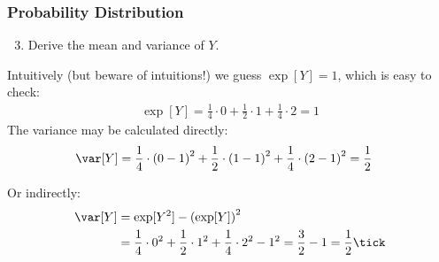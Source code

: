 \begin{frame}
\frametitle{Probability Distribution}
\ask
\begin{enumerate}\setcounter{enumi}{2}
\item Derive the mean and variance of $Y$.
\end{enumerate}

\begin{answer}
Intuitively (but beware of intuitions!) we guess $\exp[Y]=1$, which is easy to check:
\begin{align*}
\exp[Y] 
  = \frac{1}{4} \cdot 0
  + \frac{1}{2} \cdot 1
  + \frac{1}{4} \cdot 2
  = 1 
\end{align*}
The variance may be calculated directly:
\begin{align*}
\var[Y] 
& = \frac{1}{4} \cdot \left(0-1\right)^2
  + \frac{1}{2} \cdot \left(1-1\right)^2
  + \frac{1}{4} \cdot \left(2-1\right)^2
  = \frac{1}{2}
\end{align*}

Or indirectly:
\begin{align*}
\var[Y] 
& = \exp[Y^2] - \left(\exp[Y]\right)^2\\
& = \frac{1}{4} \cdot 0^2
  + \frac{1}{2} \cdot 1^2
  + \frac{1}{4} \cdot 2^2
  - 1^2
  = \frac{3}{2} - 1 
  = \frac{1}{2}
    \tick
\end{align*}
\end{answer}

\end{frame}



